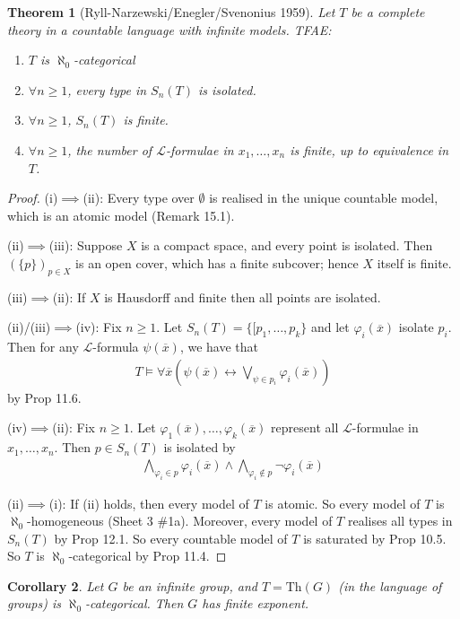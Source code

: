 \documentclass[]{article}
\theoremstyle{custhm}
\newtheorem{theorem}{Theorem}[section]
\theoremstyle{cusdef}
\theoremstyle{custhm}
\theoremstyle{custhm}
\newtheorem{cor}[theorem]{Corollary}
\theoremstyle{custhm}
\theoremstyle{ex}
\theoremstyle{custhm}
\theoremstyle{cusdef}
\theoremstyle{remark}
\theoremstyle{remark}
\theoremstyle{numremark}
\renewcommand{\L}{\mathcal{L}}
\renewcommand{\phi}{\varphi}
\renewcommand{\bar}{\overline}
\newcommand{\Th}{\textrm{Th}}
\begin{document}
\begin{theorem}[Ryll-Narzewski/Enegler/Svenonius 1959]
	Let $T$ be a complete theory in a countable language with infinite models. TFAE:
	\begin{enumerate}[label=\emph{\roman*)}]
		\item $T$ is $\aleph_0$-categorical
		\item $\forall n\ge 1$, every type in $S_n(T)$ is isolated.
		\item $\forall n\ge 1$, $S_n(T)$ is finite.
		\item $\forall n\ge 1$, the number of $\L$-formulae in $x_1,\dots,x_n$ is finite, up to equivalence in $T$.
	\end{enumerate}
\end{theorem}
\begin{proof}
	(i)$\implies$(ii): Every type over $\emptyset$ is realised in the unique countable model, which is an atomic model (Remark 15.1).

	(ii)$\implies$(iii): Suppose $X$ is a compact space, and every point is isolated. Then $(\{p\})_{p\in X}$ is an open cover, which has a finite subcover; hence $X$ itself is finite.

	(iii)$\implies$(ii): If $X$ is Hausdorff and finite then all points are isolated.

	(ii)/(iii)$\implies$(iv): Fix $n\ge 1$. Let $S_n(T) = \{[p_1,\dots,p_k\}$ and let $\phi_i(\bar{x})$ isolate $p_i$. Then for any $\L$-formula $\psi(\bar{x})$, we have that
	\begin{align*}
		T\models\forall\bar{x}\left(\psi(\bar{x})\leftrightarrow\bigvee_{\psi\in p_i}\phi_i(\bar{x})\right)
	\end{align*}
	by Prop 11.6.

	(iv)$\implies$(ii): Fix $n\ge 1$. Let $\phi_1(\bar{x}),\dots,\phi_k(\bar{x})$ represent all $\L$-formulae in $x_1,\dots,x_n$. Then $p \in S_n(T)$ is isolated by
	\begin{align*}
		\bigwedge_{\phi_i\in p}\phi_i(\bar{x}) \land \bigwedge_{\phi_i\not\in p}\neg\phi_i(\bar{x})
	\end{align*}

	(ii)$\implies$(i): If (ii) holds, then every model of $T$ is atomic. So every model of $T$ is $\aleph_0$-homogeneous (Sheet 3 \#1a). Moreover, every model of $T$ realises all types in $S_n(T)$ by Prop 12.1. So every countable model of $T$ is saturated by Prop 10.5. So $T$ is $\aleph_0$-categorical by Prop 11.4.
\end{proof}
\begin{cor}
	Let $G$ be an infinite group, and $T = \Th(G)$ (in the language of groups) is $\aleph_0$-categorical. Then $G$ has finite exponent.
\end{cor}
\end{document}
